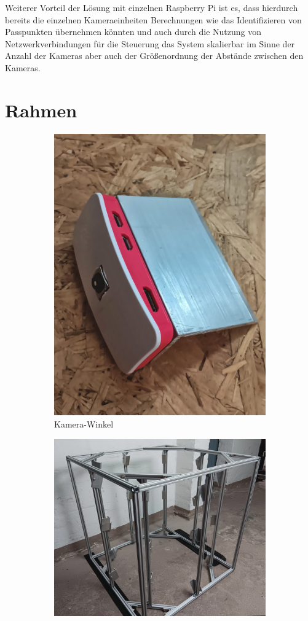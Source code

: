 \documentclass[./00PhotoBox.tex]{subfiles}
\begin{document}
Weiterer Vorteil der Lösung mit einzelnen Raspberry Pi ist es, dass hierdurch bereits die einzelnen Kameraeinheiten Berechnungen wie das Identifizieren von Passpunkten übernehmen könnten und auch durch die Nutzung von Netzwerkverbindungen für die Steuerung das System skalierbar im Sinne der Anzahl der Kameras aber auch der Größenordnung der Abstände zwischen den Kameras.

\section{Rahmen}

\begin{figure}
    \centering
    \begin{subfigure}{0.45\textwidth}
        \includegraphics[height=0.9\linewidth]{./img/aluwinkel.jpg}
        \centering
        \caption{Kamera-Winkel} %
        \label{img:aluwinkel} %
    \end{subfigure}
    \begin{subfigure}{0.45\textwidth}
        \includegraphics[height=0.8\linewidth]{./img/alurahmen.jpg}

\end{subfigure}
\end{figure}
\end{document}
